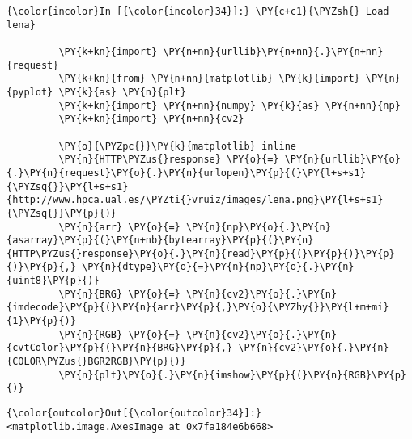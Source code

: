     \begin{Verbatim}[commandchars=\\\{\}]
{\color{incolor}In [{\color{incolor}34}]:} \PY{c+c1}{\PYZsh{} Load lena}
         
         \PY{k+kn}{import} \PY{n+nn}{urllib}\PY{n+nn}{.}\PY{n+nn}{request}
         \PY{k+kn}{from} \PY{n+nn}{matplotlib} \PY{k}{import} \PY{n}{pyplot} \PY{k}{as} \PY{n}{plt}
         \PY{k+kn}{import} \PY{n+nn}{numpy} \PY{k}{as} \PY{n+nn}{np}
         \PY{k+kn}{import} \PY{n+nn}{cv2}
         
         \PY{o}{\PYZpc{}}\PY{k}{matplotlib} inline
         \PY{n}{HTTP\PYZus{}response} \PY{o}{=} \PY{n}{urllib}\PY{o}{.}\PY{n}{request}\PY{o}{.}\PY{n}{urlopen}\PY{p}{(}\PY{l+s+s1}{\PYZsq{}}\PY{l+s+s1}{http://www.hpca.ual.es/\PYZti{}vruiz/images/lena.png}\PY{l+s+s1}{\PYZsq{}}\PY{p}{)}
         \PY{n}{arr} \PY{o}{=} \PY{n}{np}\PY{o}{.}\PY{n}{asarray}\PY{p}{(}\PY{n+nb}{bytearray}\PY{p}{(}\PY{n}{HTTP\PYZus{}response}\PY{o}{.}\PY{n}{read}\PY{p}{(}\PY{p}{)}\PY{p}{)}\PY{p}{,} \PY{n}{dtype}\PY{o}{=}\PY{n}{np}\PY{o}{.}\PY{n}{uint8}\PY{p}{)}
         \PY{n}{BRG} \PY{o}{=} \PY{n}{cv2}\PY{o}{.}\PY{n}{imdecode}\PY{p}{(}\PY{n}{arr}\PY{p}{,}\PY{o}{\PYZhy{}}\PY{l+m+mi}{1}\PY{p}{)}
         \PY{n}{RGB} \PY{o}{=} \PY{n}{cv2}\PY{o}{.}\PY{n}{cvtColor}\PY{p}{(}\PY{n}{BRG}\PY{p}{,} \PY{n}{cv2}\PY{o}{.}\PY{n}{COLOR\PYZus{}BGR2RGB}\PY{p}{)}
         \PY{n}{plt}\PY{o}{.}\PY{n}{imshow}\PY{p}{(}\PY{n}{RGB}\PY{p}{)}
\end{Verbatim}


\begin{Verbatim}[commandchars=\\\{\}]
{\color{outcolor}Out[{\color{outcolor}34}]:} <matplotlib.image.AxesImage at 0x7fa184e6b668>
\end{Verbatim}
            
    \begin{center}
    \end{center}
    { \hspace*{\fill} \\}
    
